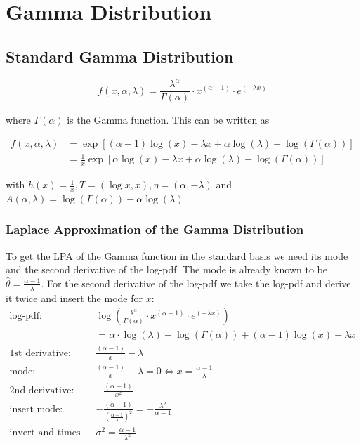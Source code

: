 \section{Gamma Distribution}

\subsection{Standard Gamma Distribution}

\begin{equation}
	f(x, \alpha, \lambda) = \frac{\lambda^\alpha}{\Gamma(\alpha)} \cdot x^{(\alpha - 1)} \cdot e^{(-\lambda x)}
	\label{eq:gamma_pdf}
\end{equation}

where $\Gamma(\alpha)$ is the Gamma function. This can be written as

\begin{align}
	f(x, \alpha, \lambda) &= \exp \left[(\alpha -1)\log(x) - \lambda x + \alpha \log(\lambda) - \log(\Gamma(\alpha))\right] \\
	&= \frac{1}{x} \exp\left[\alpha\log(x) - \lambda x + \alpha \log(\lambda) - \log(\Gamma(\alpha))\right]
	\label{eq:gamma_exp_family}
\end{align}

with $h(x) = \frac{1}{x}, T=(\log x, x), \eta=(\alpha, -\lambda)$ and $A(\alpha, \lambda) = \log(\Gamma(\alpha)) - \alpha  \log(\lambda)$. 

\subsubsection{Laplace Approximation of the Gamma Distribution}

To get the LPA of the Gamma function in the standard basis we need its mode and the second derivative of the log-pdf. The mode is already known to be $\hat{\theta} = \frac{\alpha -1}{\lambda}$. For the second derivative of the log-pdf we take the log-pdf and derive it twice and insert the mode for $x$:
\begin{align*}
	\text{log-pdf: } &\log\left( \frac{\lambda^\alpha}{\Gamma(\alpha)} \cdot x^{(\alpha - 1)} \cdot e^{(-\lambda x)}\right) \\
	&= \alpha \cdot \log(\lambda) - \log(\Gamma(\alpha)) + (\alpha -1)\log(x) -\lambda x\\
	\text{1st derivative: }& \frac{(\alpha-1)}{x} - \lambda \\
	\text{mode: }&  \frac{(\alpha-1)}{x} - \lambda = 0 \Leftrightarrow x=\frac{\alpha -1}{\lambda}\\
	\text{2nd derivative: }& -\frac{(\alpha-1)}{x^2}\\
	\text{insert mode: }& -\frac{(\alpha-1)}{(\frac{\alpha -1}{\lambda})^2} = -\frac{\lambda^2}{\alpha - 1} \\
	\text{invert and times -1: }&\sigma^2 = \frac{\alpha-1}{\lambda^2}
\end{align*}

